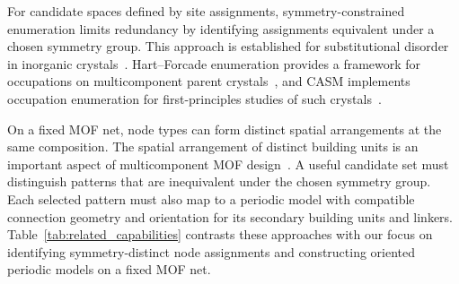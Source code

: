 \documentclass[a5paper, 10pt]{article}
\begin{document}
For candidate spaces defined by site assignments, symmetry-constrained enumeration limits redundancy by identifying assignments equivalent under a chosen symmetry group.
This approach is established for substitutional disorder in inorganic crystals~\cite{hart2012generating}. Hart--Forcade enumeration provides a framework for occupations on multicomponent parent crystals~\cite{hart2008algorithm}, and CASM implements occupation enumeration for first-principles studies of such crystals~\cite{PUCHALA2023111897}.%

On a fixed MOF net, node types can form distinct spatial arrangements at the same composition. The spatial arrangement of distinct building units is an important aspect of multicomponent MOF design~\cite{xu2020anisotropic}. A useful candidate set must distinguish patterns that are inequivalent under the chosen symmetry group. Each selected pattern must also map to a periodic model with compatible connection geometry and orientation for its secondary building units and linkers. Table~\ref{tab:related_capabilities} contrasts these approaches with our focus on identifying symmetry-distinct node assignments and constructing oriented periodic models on a fixed MOF net. %
\end{document}
